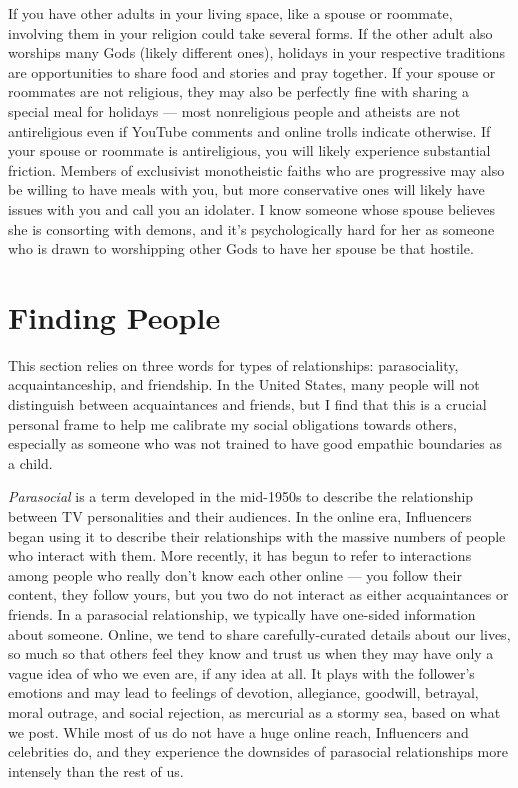 \documentclass[
]{book}
\begin{document}
If you have other adults in your living space, like a spouse or roommate, involving them in your religion could take several forms. If the other adult also worships many Gods (likely different ones), holidays in your respective traditions are opportunities to share food and stories and pray together. If your spouse or roommates are not religious, they may also be perfectly fine with sharing a special meal for holidays --- most nonreligious people and atheists are not antireligious even if YouTube comments and online trolls indicate otherwise. If your spouse or roommate is antireligious, you will likely experience substantial friction. Members of exclusivist monotheistic faiths who are progressive may also be willing to have meals with you, but more conservative ones will likely have issues with you and call you an idolater. I know someone whose spouse believes she is consorting with demons, and it's psychologically hard for her as someone who is drawn to worshipping other Gods to have her spouse be that hostile.

\hypertarget{finding-people}{%
\section{Finding People}\label{finding-people}}

This section relies on three words for types of relationships: parasociality, acquaintanceship, and friendship. In the United States, many people will not distinguish between acquaintances and friends, but I find that this is a crucial personal frame to help me calibrate my social obligations towards others, especially as someone who was not trained to have good empathic boundaries as a child.

\emph{Parasocial} is a term developed in the mid-1950s to describe the relationship between TV personalities and their audiences. In the online era, Influencers began using it to describe their relationships with the massive numbers of people who interact with them. More recently, it has begun to refer to interactions among people who really don't know each other online --- you follow their content, they follow yours, but you two do not interact as either acquaintances or friends. In a parasocial relationship, we typically have one-sided information about someone. Online, we tend to share carefully-curated details about our lives, so much so that others feel they know and trust us when they may have only a vague idea of who we even are, if any idea at all. It plays with the follower's emotions and may lead to feelings of devotion, allegiance, goodwill, betrayal, moral outrage, and social rejection, as mercurial as a stormy sea, based on what we post. While most of us do not have a huge online reach, Influencers and celebrities do, and they experience the downsides of parasocial relationships more intensely than the rest of us.
\end{document}
